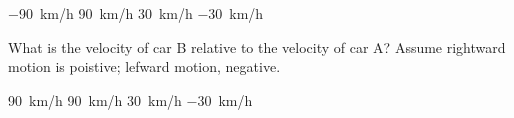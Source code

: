 \documentclass[../main-physics-problems.tex]{subfiles}
\begin{document}
\begin{questions}
\begin{randomizechoices}
    \correctchoice \SI{-90}{km/h}
    \choice \SI{90}{km/h}
    \choice \SI{30}{km/h}
    \choice \SI{-30}{km/h}
\end{randomizechoices}

\question
What is the velocity of car B relative to the velocity of car A? Assume rightward motion is poistive; lefward motion, negative.

\begin{center}
\end{center}

\begin{randomizechoices}
    \choice \SI{90}{km/h}
    \correctchoice \SI{90}{km/h}
    \choice \SI{30}{km/h}
    \choice \SI{-30}{km/h}
\end{randomizechoices}







\end{questions}
\end{document}
